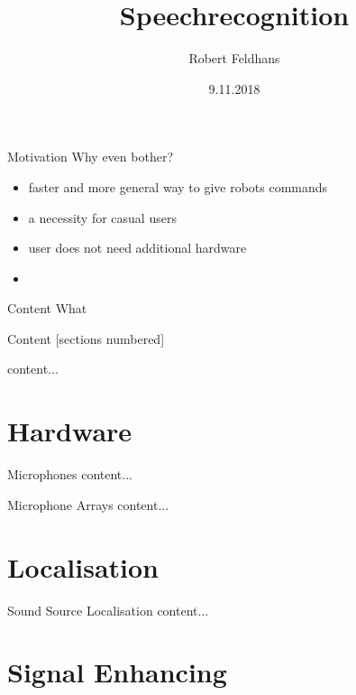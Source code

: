 \documentclass{beamer}
\title{Speechrecognition}
\date{9.11.2018}
\author{Robert Feldhans}
\institute{Seminar Robocup}
\begin{document}
	\maketitle
	
	\begin{frame}{Motivation}
		Why even bother?
		\begin{itemize}
			\item faster and more general way to give robots commands
			\item a necessity for casual users
			\item user does not need additional hardware
			\item 
		\end{itemize}
	\end{frame}
	
	\begin{frame}{Content}
		What 
	\end{frame}
	
	\begin{frame}{Content}
		[sections numbered]
		\tableofcontents[hideallsubsections]
	\end{frame}
	
	\begin{frame}{}
		content...
	\end{frame}
	
	
	\section{Hardware}%
	
	\begin{frame}{Microphones}
		content...
	\end{frame}
	
	\begin{frame}{Microphone Arrays}
		content...
	\end{frame}
	
	\section{Localisation}%
	
	\begin{frame}{Sound Source Localisation}
		content...
	\end{frame}
	
	\section{Signal Enhancing}%
	
\end{document}
